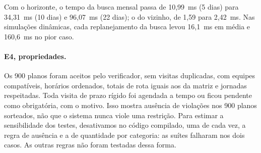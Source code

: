 \documentclass[11pt,a4paper]{article}
\begin{document}
Com o horizonte, o tempo da busca mensal passa de 10,99~ms (5 dias) para 34,31~ms (10 dias) e 96,07~ms (22 dias); o do vizinho, de 1,59 para 2,42~ms. Nas simulações dinâmicas, cada replanejamento da busca levou 16,1~ms em média e 160,6~ms no pior caso.

\paragraph{E4, propriedades.} Os 900 planos foram aceitos pelo verificador, sem visitas duplicadas, com equipes compatíveis, horários ordenados, totais de rota iguais aos da matriz e jornadas respeitadas. Toda visita de prazo rígido foi agendada a tempo ou ficou pendente como obrigatória, com o motivo. Isso mostra ausência de violações nos 900 planos sorteados, não que o sistema nunca viole uma restrição. Para estimar a sensibilidade dos testes, desativamos no código compilado, uma de cada vez, a regra de ausência e a de quantidade por categoria: as suítes falharam nos dois casos. As outras regras não foram testadas dessa forma.
\end{document}

